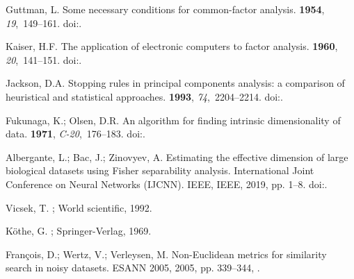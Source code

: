 \documentclass[entropy,article,submit,moreauthors,pdftex]{Definitions/mdpi}
\begin{document}
\begin{thebibliography}{-------}
Guttman, L.
\newblock Some necessary conditions for common-factor analysis.
 {\bf 1954}, {\em 19},~149--161.
\newblock
  doi:{\href{https://doi.org/10.1007/bf02289162}{}}.

Kaiser, H.F.
\newblock The application of electronic computers to factor analysis.
 {\bf 1960}, {\em 20},~141--151.
\newblock
  doi:{\href{https://doi.org/10.1177/001316446002000116}{}}.

Jackson, D.A.
\newblock Stopping rules in principal components analysis: a comparison of
  heuristical and statistical approaches.
 {\bf 1993}, {\em 74},~2204--2214.
\newblock
  doi:{\href{https://doi.org/10.2307/1939574}{}}.

Fukunaga, K.; Olsen, D.R.
\newblock An algorithm for finding intrinsic dimensionality of data.
 {\bf 1971}, {\em C-20},~176--183.
\newblock
  doi:{\href{https://doi.org/10.1109/T-C.1971.223208}{}}.

Albergante, L.; Bac, J.; Zinovyev, A.
\newblock Estimating the effective dimension of large biological datasets using
  Fisher separability analysis.
 International Joint Conference on Neural Networks (IJCNN).
  IEEE, {IEEE},  2019, pp. 1--8.
\newblock
  doi:{\href{https://doi.org/10.1109/ijcnn.2019.8852450}{}}.

Vicsek, T.
; World scientific,  1992.

K{\"o}the, G.
;
  Springer-Verlag,  1969.

Fran{\c{c}}ois, D.; Wertz, V.; Verleysen, M.
\newblock Non-{E}uclidean metrics for similarity search in noisy datasets.
\newblock  ESANN 2005,  2005, pp. 339--344,
  \href{https://www.elen.ucl.ac.be/Proceedings/esann/esannpdf/es2005-116.pdf}{{}}.


\end{thebibliography}
\end{document}
